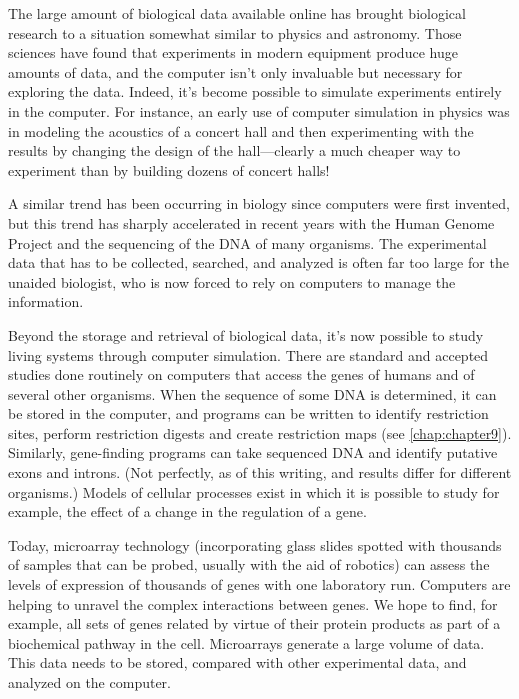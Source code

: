 The large amount of biological data available online has brought biological research to a situation somewhat similar to physics and astronomy. Those sciences have found that experiments in modern equipment produce huge amounts of data, and the computer isn't only invaluable but necessary for exploring the data. Indeed, it's become possible to simulate experiments entirely in the computer. For instance, an early use of computer simulation in physics was in modeling the acoustics of a concert hall and then experimenting with the results by changing the design of the hall—clearly a much cheaper way to experiment than by building dozens of concert halls!

A similar trend has been occurring in biology since computers were first invented, but this trend has sharply accelerated in recent years with the Human Genome Project and the sequencing of the DNA of many organisms. The experimental data that has to be collected, searched, and analyzed is often far too large for the unaided biologist, who is now forced to rely on computers to manage the information.

Beyond the storage and retrieval of biological data, it's now possible to study living systems through computer simulation. There are standard and accepted studies done routinely on computers that access the genes of humans and of several other organisms. When the sequence of some DNA is determined, it can be stored in the computer, and programs can be written to identify restriction sites, perform restriction digests and create restriction maps (see \autoref{chap:chapter9}). Similarly, gene-finding programs can take sequenced DNA and identify putative exons and introns.  (Not perfectly, as of this writing, and results differ for different organisms.) Models of cellular processes exist in which it is possible to study for example, the effect of a change in the regulation of a gene.

Today, microarray technology (incorporating glass slides spotted with thousands of samples that can be probed, usually with the aid of robotics) can assess the levels of expression of thousands of genes with one laboratory run. Computers are helping to unravel the complex interactions between genes. We hope to find, for example, all sets of genes related by virtue of their protein products as part of a biochemical pathway in the cell. Microarrays generate a large volume of data. This data needs to be stored, compared with other experimental data, and analyzed on the computer.

